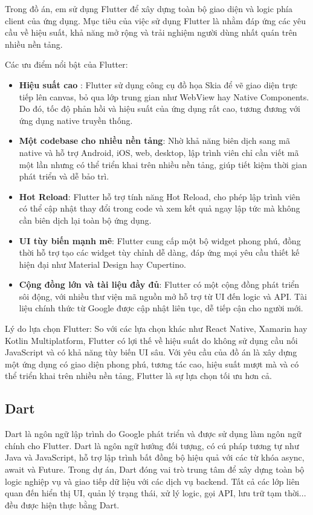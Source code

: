 \documentclass[../DoAn.tex]{subfiles}
\begin{document}
Trong đồ án, em sử dụng Flutter để xây dựng toàn bộ giao diện và logic phía client của ứng dụng. Mục tiêu của việc sử dụng Flutter là nhằm đáp ứng các yêu cầu về hiệu suất, khả năng mở rộng và trải nghiệm người dùng nhất quán trên nhiều nền tảng.

Các ưu điểm nổi bật của Flutter:
\begin{itemize} 
\item \textbf{Hiệu suất cao} : Flutter sử dụng công cụ đồ họa Skia để vẽ giao diện trực tiếp lên canvas, bỏ qua lớp trung gian như WebView hay Native Components. Do đó, tốc độ phản hồi và hiệu suất của ứng dụng rất cao, tương đương với ứng dụng native truyền thống.
\item \textbf{Một codebase cho nhiều nền tảng}: Nhờ khả năng biên dịch sang mã native và hỗ trợ Android, iOS, web, desktop, lập trình viên chỉ cần viết mã một lần nhưng có thể triển khai trên nhiều nền tảng, giúp tiết kiệm thời gian phát triển và dễ bảo trì.
\item  \textbf{Hot Reload}: Flutter hỗ trợ tính năng Hot Reload, cho phép lập trình viên có thể cập nhật thay đổi trong code và xem kết quả ngay lập tức mà không cần biên dịch lại toàn bộ ứng dụng.
\item \textbf{UI tùy biến mạnh mẽ}: Flutter cung cấp một bộ widget phong phú, đồng thời hỗ trợ tạo các widget tùy chỉnh dễ dàng, đáp ứng mọi yêu cầu thiết kế hiện đại như Material Design hay Cupertino.
\item \textbf{Cộng đồng lớn và tài liệu đầy đủ}: Flutter có một cộng đồng phát triển sôi động, với nhiều thư viện mã nguồn mở hỗ trợ từ UI đến logic và API. Tài liệu chính thức từ Google được cập nhật liên tục, dễ tiếp cận cho người mới.
\end{itemize}


Lý do lựa chọn Flutter: So với các lựa chọn khác như React Native, Xamarin hay Kotlin Multiplatform, Flutter có lợi thế về hiệu suất do không sử dụng cầu nối JavaScript và có khả năng tùy biến UI sâu. Với yêu cầu của đồ án là xây dựng một ứng dụng có giao diện phong phú, tương tác cao, hiệu suất mượt mà và có thể triển khai trên nhiều nền tảng, Flutter là sự lựa chọn tối ưu hơn cả.

\subsection{Dart\cite{Dart}}
Dart là ngôn ngữ lập trình do Google phát triển và được sử dụng làm ngôn ngữ chính cho Flutter. Dart là ngôn ngữ hướng đối tượng, có cú pháp tương tự như Java và JavaScript, hỗ trợ lập trình bất đồng bộ hiệu quả với các từ khóa async, await và Future.
Trong dự án, Dart đóng vai trò trung tâm để xây dựng toàn bộ logic nghiệp vụ và giao tiếp dữ liệu với các dịch vụ backend. Tất cả các lớp liên quan đến hiển thị UI, quản lý trạng thái, xử lý logic, gọi API, lưu trữ tạm thời... đều được hiện thực bằng Dart.
\end{document}
